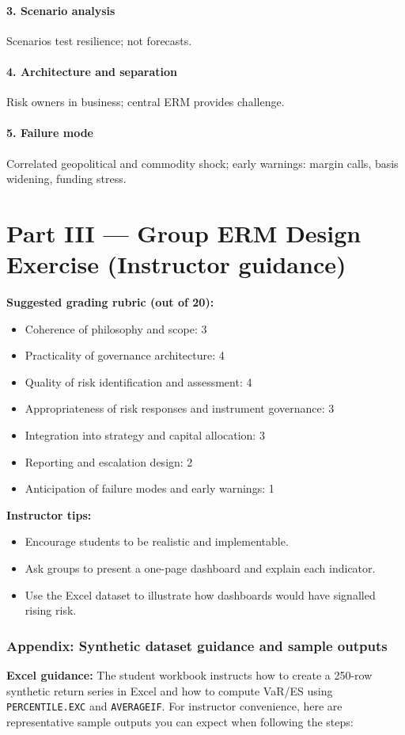 \documentclass[11pt]{article}
\begin{document}
\subsection*{3. Scenario analysis}
Scenarios test resilience; not forecasts.

\subsection*{4. Architecture and separation}
Risk owners in business; central ERM provides challenge.

\subsection*{5. Failure mode}
Correlated geopolitical and commodity shock; early warnings: margin calls, basis widening, funding stress.

\newpage
\part*{Part III --- Group ERM Design Exercise (Instructor guidance)}
\textbf{Suggested grading rubric (out of 20):}
\begin{itemize}
  \item Coherence of philosophy and scope: 3
  \item Practicality of governance architecture: 4
  \item Quality of risk identification and assessment: 4
  \item Appropriateness of risk responses and instrument governance: 3
  \item Integration into strategy and capital allocation: 3
  \item Reporting and escalation design: 2
  \item Anticipation of failure modes and early warnings: 1
\end{itemize}

\textbf{Instructor tips:}
\begin{itemize}
  \item Encourage students to be realistic and implementable.
  \item Ask groups to present a one-page dashboard and explain each indicator.
  \item Use the Excel dataset to illustrate how dashboards would have signalled rising risk.
\end{itemize}

\newpage
\section*{Appendix: Synthetic dataset guidance and sample outputs}
\textbf{Excel guidance:} The student workbook instructs how to create a 250-row synthetic return series in Excel and how to compute VaR/ES using \texttt{PERCENTILE.EXC} and \texttt{AVERAGEIF}. For instructor convenience, here are representative sample outputs you can expect when following the steps:
\end{document}
